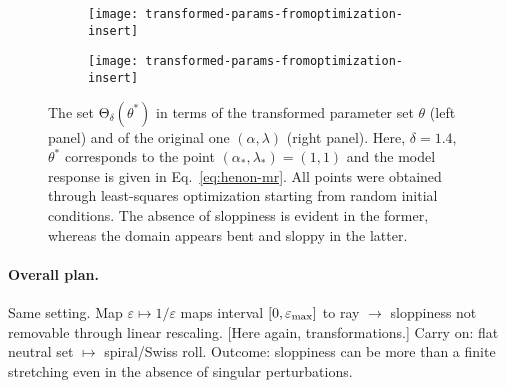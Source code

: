 \documentclass{article}
\newcommand{\eps}{\varepsilon}
\newcommand{\p}{\theta}
\newcommand{\ps}{\mathrm{\Theta}}
\begin{document}
%
\begin{figure}[ht!]
 \begin{subfigure}[t]{0.49\textwidth}
  \centering
  \texttt{[image: transformed-params-fromoptimization-insert]}
 \end{subfigure}
 \begin{subfigure}[t]{0.49\textwidth}
  \centering
  \texttt{[image: transformed-params-fromoptimization-insert]}
 \end{subfigure} %
\caption{
The set $\ps_\delta(\p^*)$ in terms of the transformed parameter set $\p$ (left panel) and of the original one $(\alpha,\lambda)$ (right panel).
Here, $\delta = 1.4$, $\p^*$ corresponds to the point $(\alpha_*,\lambda_*) = (1,1)$ and the model response is given in Eq.~\eqref{eq:henon-mr}.
All points were obtained through least-squares optimization starting from random initial conditions.
The absence of sloppiness is evident in the former, whereas the domain appears bent and sloppy in the latter.
\label{f.transf-params}}
\end{figure}

{\color{gray}\paragraph{Overall plan.}
Same setting.  Map $\eps \mapsto 1/\eps$ maps interval
$[0,\eps_{\rm max}]$ to ray $\rightarrow$ sloppiness not removable
through linear rescaling.  [Here again, transformations.] Carry on:
flat neutral set $\mapsto$ spiral/Swiss roll.  Outcome: sloppiness can
be more than a finite stretching even in the absence of singular
perturbations.}\\
\end{document}
